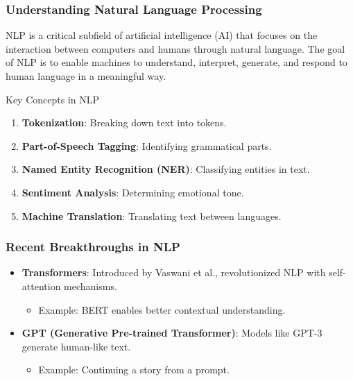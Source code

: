 \documentclass[aspectratio=169]{beamer}
\begin{document}
\begin{frame}
    \frametitle{Understanding Natural Language Processing}
    NLP is a critical subfield of artificial intelligence (AI) that focuses on the 
    interaction between computers and humans through natural language. The goal of 
    NLP is to enable machines to understand, interpret, generate, and respond to 
    human language in a meaningful way.

    \begin{block}{Key Concepts in NLP}
        \begin{enumerate}
            \item \textbf{Tokenization}: Breaking down text into tokens.
            \item \textbf{Part-of-Speech Tagging}: Identifying grammatical parts.
            \item \textbf{Named Entity Recognition (NER)}: Classifying entities in text.
            \item \textbf{Sentiment Analysis}: Determining emotional tone.
            \item \textbf{Machine Translation}: Translating text between languages.
        \end{enumerate}
    \end{block}
\end{frame}

\begin{frame}
    \frametitle{Recent Breakthroughs in NLP}
    \begin{itemize}
        \item \textbf{Transformers}: Introduced by Vaswani et al., revolutionized NLP with self-attention mechanisms.
        \begin{itemize}
            \item Example: BERT enables better contextual understanding.
        \end{itemize}
        
        \item \textbf{GPT (Generative Pre-trained Transformer)}: Models like GPT-3 generate human-like text.
        \begin{itemize}
            \item Example: Continuing a story from a prompt.
        \end{itemize}
    \end{itemize}
\end{frame}
\end{document}
